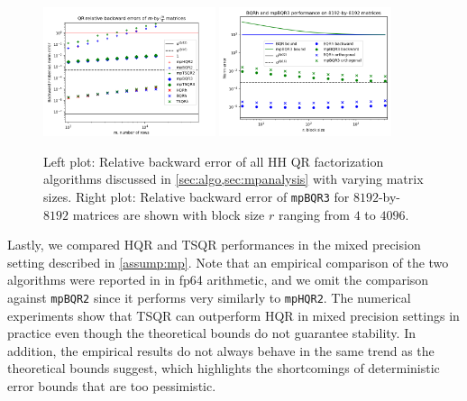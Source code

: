 \begin{figure}[h!]%
	\centering
	\vspace{-10pt}
	\includegraphics[width=0.45\textwidth]{./figures/sizefig.png}
	\includegraphics[width=0.45\textwidth]{./figures/mpBQR3-blocksize.png}
	\caption{\label{fig:sizempBQR3}Left plot: Relative backward error of all HH QR factorization algorithms discussed in \cref{sec:algo,sec:mpanalysis} with varying matrix sizes. Right plot: Relative backward error of {\tt mpBQR3} for $8192$-by-$8192$ matrices are shown with block size $r$ ranging from $4$ to $4096$.}
	\vspace{-10pt}
\end{figure} 
Lastly, we compared HQR and TSQR performances in the mixed precision setting described in \cref{assump:mp}.
Note that an empirical comparison of the two algorithms were reported in \cite{Mori2012} in fp64 arithmetic, and we omit the comparison against {\tt mpBQR2} since it performs very similarly to {\tt mpHQR2}.
The numerical experiments show that TSQR can outperform HQR in mixed precision settings in practice even though the theoretical bounds do not guarantee stability.
In addition, the empirical results do not always behave in the same trend as the theoretical bounds suggest, which highlights the shortcomings of deterministic error bounds that are too pessimistic. \par
